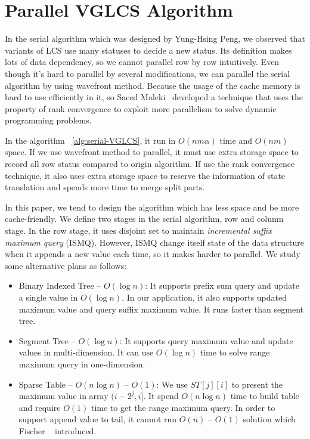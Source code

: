 \section{Parallel VGLCS Algorithm} %
\label{sec:parallelSerial}

In the serial algorithm which was designed by Yung-Hsing Peng, we
observed that variants of LCS use many statuses to decide a new
status. Its definition makes lots of data dependency, so we cannot
parallel row by row intuitively.  Even though it's hard to parallel by
several modifications, we can parallel the serial algorithm by using
wavefront method.  Because the usage of the cache memory is hard to
use efficiently in it, so Saeed Maleki~\cite{Maleki2016EfficientPU} developed a
technique that uses the property of rank convergence to exploit more
parallelism to solve dynamic programming problems.



In the algorithm ~\ref{alg:serial-VGLCS}, it run in $O(nm \alpha)$
time and $O(nm)$ space.  If we use wavefront method to parallel, it
must use extra storage space to record all row status compared to
origin algorithm.  If use the rank convergence technique, it also uses
extra storage space to reserve the information of state translation
and spends more time to merge split parts.

In this paper, we tend to design the algorithm which has less space
and be more cache-friendly.  We define two stages in the serial
algorithm, row and column stage.  In the row stage, it uses disjoint
set to maintain \emph{incremental suffix maximum query} (ISMQ).
However, ISMQ change itself state of the data structure when it
appends a new value each time, so it makes harder to parallel.  We
study some alternative plans as follows:

\begin{itemize}
  \item 

Binary Indexed Tree -- $O(\log n)$: It supports prefix sum query and
update a single value in $O(\log n)$.  In our application, it also
supports updated maximum value and query suffix maximum value.  It runs
faster than segment tree.

  \item 

Segment Tree -- $O(\log n)$: It supports query maximum value and
update values in multi-dimension.  It can use $O(\log n)$ time to
solve range maximum query in one-dimension.

  \item 

Sparse Table -- $O(n \log n)$ -- $O(1)$: We use $ST[j][i]$ to present
the maximum value in array $(i-2^j,i]$.  It spend $O(n \log n)$ time
to build table and require $O(1)$ time to get the range maximum query.
In order to support append value to tail, it cannot run $O(n)$ --
$O(1)$ solution which Fischer ~\cite{Fischer2006TheoreticalAP} introduced.

\end{itemize}

